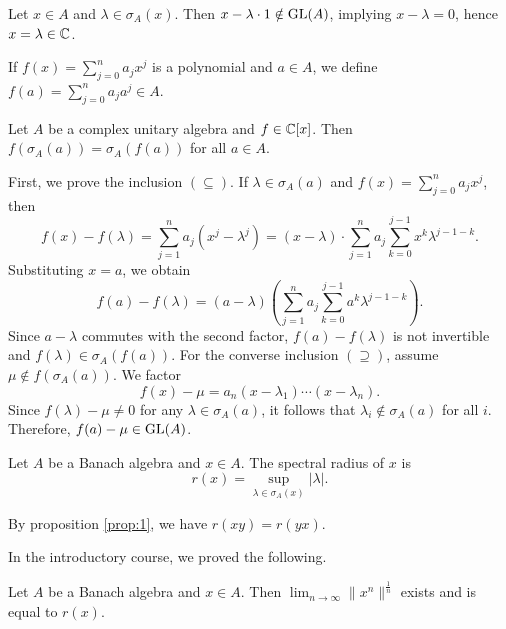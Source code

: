 \begin{myproof}
  Let $x \in A$ and $\lambda \in \sigma_A (x)$. Then $x - \lambda \cdot 1 \notin \operatorname{GL}(A)$, implying
  $x - \lambda = 0$, hence $x = \lambda \in \mathbb {C}$.
\end{myproof}

\begin{definition}
  If $f(x) = \sum_{j = 0} ^n a_j x^j$ is a polynomial and $a \in A$, we define 
  $f(a) = \sum _{j = 0} ^n a_j a^j \in A$.
\end{definition}

\begin{theorem}
  Let $A$ be a complex unitary algebra and $f \in \mathbb {C} [x]$. Then $f(\sigma_A (a)) = \sigma_A (f(a))$
  for all $a \in A$.
\end{theorem}

\begin{myproof}
  First, we prove the inclusion $(\subseteq)$.
  If $\lambda \in \sigma_A (a)$ and $f(x) = \sum_{j = 0} ^n a_j x^j$, then 
  $$f(x) - f(\lambda) = \sum_{j = 1} ^n a_j (x^j - \lambda^j) = (x - \lambda) \cdot \sum_{j = 1} ^n a_j \sum_{k = 0} ^{j -1} x^k \lambda^{j - 1 - k}.$$
  Substituting $x = a$, we obtain
  $$f(a) - f(\lambda) = (a - \lambda) \left(\sum_{j = 1} ^n a_j \sum_{k = 0} ^{j - 1} a^k \lambda^{j - 1 - k} \right).$$
  Since $a - \lambda$ commutes with the second factor, $f(a) - f(\lambda)$
  is not invertible and $f(\lambda) \in \sigma_A (f(a))$.
  For the converse inclusion $(\supseteq)$, assume $\mu \notin f(\sigma_A (a))$. We factor 
  $$f(x) - \mu = a_n (x - \lambda_1) \cdots (x - \lambda_n).$$
  Since $f(\lambda) - \mu \neq 0$ for any $\lambda \in \sigma_A (a)$, it follows that $\lambda_i \notin \sigma_A (a)$ for all $i$.
  Therefore, $f(a) - \mu \in \operatorname{GL}(A)$.
\end{myproof}

\begin{definition}
  Let $A$ be a Banach algebra and $x \in A$. The spectral radius of $x$ is 
  $$r(x) = \sup_{\lambda \in \sigma_A (x)} |\lambda|.$$
\end{definition}

\begin{remark}
  By proposition \ref{prop:1}, we have $r(xy) = r(yx)$.
\end{remark}

In the introductory course, we proved the following.

\begin{theorem}
  Let $A$ be a Banach algebra and $x \in A$. Then $\lim_{n \to \infty} \|x^n\|^{\frac{1}{n}}$ exists 
  and is equal to $r(x)$.
\end{theorem}

